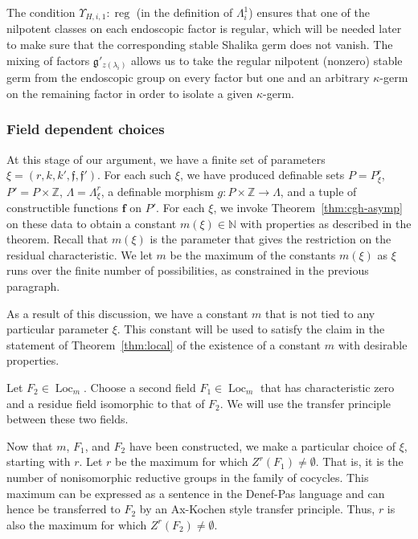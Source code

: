 \documentclass[12pt]{amsart}
\newcommand{\op}[1]{\operatorname{#1}}
\newcommand{\ring}[1]{{\mathbb #1}}
\def\s{{\mathfrak{f}}}
\def\bf{\mathbf f}
\newcommand{\fg}{\mathfrak{g}}
\theoremstyle{plain}
\theoremstyle{definition}
\begin{document}
The condition $\Upsilon_{H,i,1}:\op{reg}$ (in the
definition of $\Lambda^1_i$) ensures that one of the nilpotent classes
on each endoscopic factor is regular, which will be needed later to
make sure that the corresponding stable Shalika germ does not vanish.
The mixing of factors $\fg'_{z(\lambda_i)}$ allows us to take the
regular nilpotent (nonzero) stable germ from the endoscopic group on every factor
but one and an arbitrary $\kappa$-germ on the remaining factor in
order to isolate a given $\kappa$-germ.

\subsubsection{Field dependent choices}\label{sec:field}

At this stage of our argument, we have a finite set of parameters
$\xi=(r,k,k',\s,\s')$.  For each such $\xi$, we have produced
definable sets $P=P^r_\xi$, $P'=P\times\ring{Z}$,
$\Lambda=\Lambda^r_\xi$, a definable morphism $g:P\times\ring{Z}\to
\Lambda$, and a tuple of constructible functions $\bf$ on $P'$.  For
each $\xi$, we invoke Theorem~\ref{thm:cgh-asymp} on these data to
obtain a constant $m(\xi)\in\ring{N}$ with properties as described in
the theorem.  Recall that $m(\xi)$ is the parameter that gives the
restriction on the residual characteristic.  
We let $m$ be the maximum of the constants $m(\xi)$ as
$\xi$ runs over the finite number of possibilities, as constrained in
the previous paragraph.

As a result of this discussion, we have a constant $m$ that is not
tied to any particular parameter $\xi$.  This constant will be used to
satisfy the claim in the statement of Theorem~\ref{thm:local} of the
existence of a constant $m$ with desirable properties.

Let $F_2\in\op{Loc}_m$.  Choose a second field $F_1\in \op{Loc}_m$
that has characteristic zero and a residue field isomorphic to that of
$F_2$.  We will use the transfer principle between these two fields.

Now that $m$, $F_1$, and $F_2$ have been constructed, we make a
particular choice of $\xi$, starting with $r$.
Let $r$ be the maximum for which $Z^r(F_1)\ne\emptyset$.  That is, it is
the number of nonisomorphic reductive groups in the family of
cocycles.  This maximum can be expressed as a sentence in the Denef-Pas
language and can hence be transferred to $F_2$ by an Ax-Kochen style
transfer principle.  Thus, $r$ is also the maximum for which
$Z^r(F_2)\ne\emptyset$.
\end{document}
